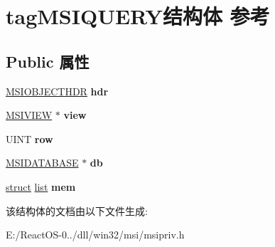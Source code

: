 \hypertarget{structtag_m_s_i_q_u_e_r_y}{}\section{tag\+M\+S\+I\+Q\+U\+E\+R\+Y结构体 参考}
\label{structtag_m_s_i_q_u_e_r_y}
\subsection*{Public 属性}
\begin{DoxyCompactItemize}
\item 
\mbox{\label{structtag_m_s_i_q_u_e_r_y_aec58156c04345d87f727547b1b1b29b1}} 
\hyperlink{structtag_m_s_i_o_b_j_e_c_t_h_d_r}{M\+S\+I\+O\+B\+J\+E\+C\+T\+H\+DR} {\bfseries hdr}
\item 
\mbox{\label{structtag_m_s_i_q_u_e_r_y_a1d61f17fec120a4bae157df766cf5b8e}} 
\hyperlink{structtag_m_s_i_v_i_e_w}{M\+S\+I\+V\+I\+EW} $\ast$ {\bfseries view}
\item 
\mbox{\label{structtag_m_s_i_q_u_e_r_y_a254fc6f1aad1d61dd36141c4956505ff}} 
U\+I\+NT {\bfseries row}
\item 
\mbox{\label{structtag_m_s_i_q_u_e_r_y_a58ce7ccfe03486236f6f8d4763e8fe80}} 
\hyperlink{structtag_m_s_i_d_a_t_a_b_a_s_e}{M\+S\+I\+D\+A\+T\+A\+B\+A\+SE} $\ast$ {\bfseries db}
\item 
\mbox{\label{structtag_m_s_i_q_u_e_r_y_a43df1d2e794553a8d16c2354f2cda0c4}} 
\hyperlink{interfacestruct}{struct} \hyperlink{classlist}{list} {\bfseries mem}
\end{DoxyCompactItemize}


该结构体的文档由以下文件生成\+:\begin{DoxyCompactItemize}
\item 
E\+:/\+React\+O\+S-\/0../dll/win32/msi/msipriv.\+h\end{DoxyCompactItemize}
